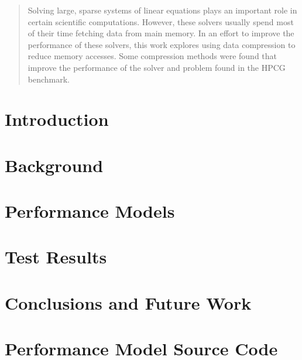 \documentclass[]{article}
\begin{document}
\clearpage

\vspace*{\fill}
\begin{abstract}
	Solving large, sparse systems of linear equations plays an important role in certain scientific computations.
	However, these solvers usually spend most of their time fetching data from main memory.
	In an effort to improve the performance of these solvers, this work explores using data compression to reduce memory accesses.
	Some compression methods were found that improve the performance of the solver and problem found in the HPCG benchmark.
\end{abstract}
\vspace*{\fill}

\clearpage

\tableofcontents

\clearpage

\section{Introduction}


\section{Background}


\section{Performance Models}


\section{Test Results}


\section{Conclusions and Future Work}





\appendix

\section{Performance Model Source Code}
\label{app:decode-model-source}

 
\end{document}
